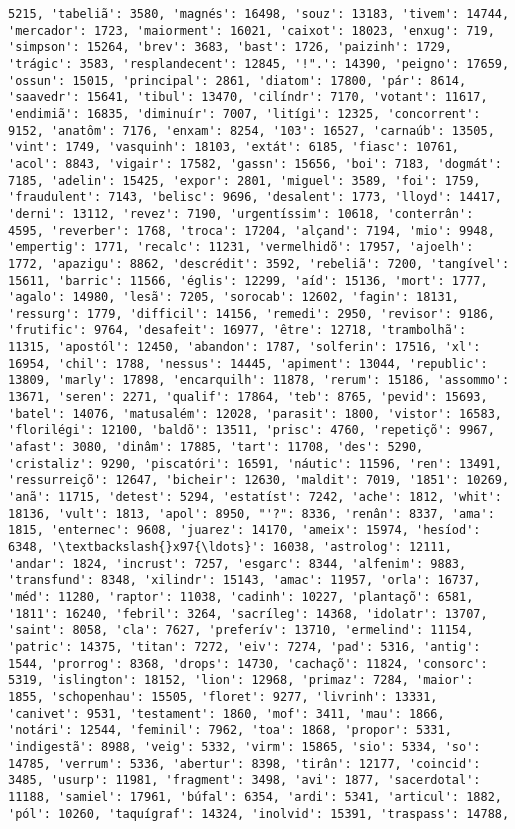 \begin{Verbatim}[commandchars=\\\{\}]
5215, 'tabeliã': 3580, 'magnés': 16498, 'souz': 13183, 'tivem': 14744, 'mercador': 1723, 'maiorment': 16021, 'caixot': 18023, 'enxug': 719, 'simpson': 15264, 'brev': 3683, 'bast': 1726, 'paizinh': 1729, 'trágic': 3583, 'resplandecent': 12845, '!".': 14390, 'peigno': 17659, 'ossun': 15015, 'principal': 2861, 'diatom': 17800, 'pár': 8614, 'saavedr': 15641, 'tibul': 13470, 'cilíndr': 7170, 'votant': 11617, 'endimiã': 16835, 'diminuír': 7007, 'litígi': 12325, 'concorrent': 9152, 'anatôm': 7176, 'enxam': 8254, '103': 16527, 'carnaúb': 13505, 'vint': 1749, 'vasquinh': 18103, 'extát': 6185, 'fiasc': 10761, 'acol': 8843, 'vigair': 17582, 'gassn': 15656, 'boi': 7183, 'dogmát': 7185, 'adelin': 15425, 'expor': 2801, 'miguel': 3589, 'foi': 1759, 'fraudulent': 7143, 'belisc': 9696, 'desalent': 1773, 'lloyd': 14417, 'derni': 13112, 'revez': 7190, 'urgentíssim': 10618, 'conterrân': 4595, 'reverber': 1768, 'troca': 17204, 'alçand': 7194, 'mio': 9948, 'empertig': 1771, 'recalc': 11231, 'vermelhidõ': 17957, 'ajoelh': 1772, 'apazigu': 8862, 'descrédit': 3592, 'rebeliã': 7200, 'tangível': 15611, 'barric': 11566, 'églis': 12299, 'aíd': 15136, 'mort': 1777, 'agalo': 14980, 'lesã': 7205, 'sorocab': 12602, 'fagin': 18131, 'ressurg': 1779, 'difficil': 14156, 'remedi': 2950, 'revisor': 9186, 'frutific': 9764, 'desafeit': 16977, 'être': 12718, 'trambolhã': 11315, 'apostól': 12450, 'abandon': 1787, 'solferin': 17516, 'xl': 16954, 'chil': 1788, 'nessus': 14445, 'apiment': 13044, 'republic': 13809, 'marly': 17898, 'encarquilh': 11878, 'rerum': 15186, 'assommo': 13671, 'seren': 2271, 'qualif': 17864, 'teb': 8765, 'pevid': 15693, 'batel': 14076, 'matusalém': 12028, 'parasit': 1800, 'vistor': 16583, 'florilégi': 12100, 'baldõ': 13511, 'prisc': 4760, 'repetiçõ': 9967, 'afast': 3080, 'dinâm': 17885, 'tart': 11708, 'des': 5290, 'cristaliz': 9290, 'piscatóri': 16591, 'náutic': 11596, 'ren': 13491, 'ressurreiçõ': 12647, 'bicheir': 12630, 'maldit': 7019, '1851': 10269, 'anã': 11715, 'detest': 5294, 'estatíst': 7242, 'ache': 1812, 'whit': 18136, 'vult': 1813, 'apol': 8950, "'?": 8336, 'renân': 8337, 'ama': 1815, 'enternec': 9608, 'juarez': 14170, 'ameix': 15974, 'hesíod': 6348, '\textbackslash{}x97{\ldots}': 16038, 'astrolog': 12111, 'andar': 1824, 'incrust': 7257, 'esgarc': 8344, 'alfenim': 9883, 'transfund': 8348, 'xilindr': 15143, 'amac': 11957, 'orla': 16737, 'méd': 11280, 'raptor': 11038, 'cadinh': 10227, 'plantaçõ': 6581, '1811': 16240, 'febril': 3264, 'sacríleg': 14368, 'idolatr': 13707, 'saint': 8058, 'cla': 7627, 'preferív': 13710, 'ermelind': 11154, 'patric': 14375, 'titan': 7272, 'eiv': 7274, 'pad': 5316, 'antig': 1544, 'prorrog': 8368, 'drops': 14730, 'cachaçõ': 11824, 'consorc': 5319, 'islington': 18152, 'lion': 12968, 'primaz': 7284, 'maior': 1855, 'schopenhau': 15505, 'floret': 9277, 'livrinh': 13331, 'canivet': 9531, 'testament': 1860, 'mof': 3411, 'mau': 1866, 'notári': 12544, 'feminil': 7962, 'toa': 1868, 'propor': 5331, 'indigestã': 8988, 'veig': 5332, 'virm': 15865, 'sio': 5334, 'so': 14785, 'verrum': 5336, 'abertur': 8398, 'tirân': 12177, 'coincid': 3485, 'usurp': 11981, 'fragment': 3498, 'avi': 1877, 'sacerdotal': 11188, 'samiel': 17961, 'búfal': 6354, 'ardi': 5341, 'articul': 1882, 'pól': 10260, 'taquígraf': 14324, 'inolvid': 15391, 'traspass': 14788, 
\end{Verbatim}
